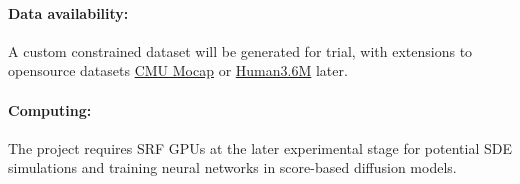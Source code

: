 \documentclass[letterpaper, 12pt]{article}
\begin{document}
\paragraph{Data availability:}
A custom constrained dataset will be generated for trial, with extensions to opensource datasets \href{http://mocap.cs.cmu.edu}{CMU Mocap} or \href{http://vision.imar.ro/human3.6m/description.php}{Human3.6M} later.
\paragraph{Computing:}
The project requires SRF GPUs at the later experimental stage for potential SDE simulations and training neural networks in score-based diffusion models.





\end{document}

